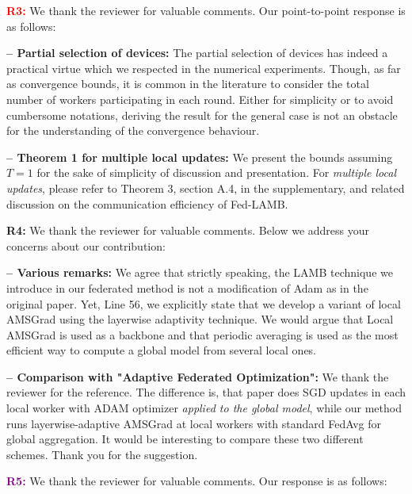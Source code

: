 \documentclass{article}
\begin{document}
 \vspace{1pt}
\textbf{\textcolor{red}{R3:}} We thank the reviewer for valuable comments.  Our point-to-point response is as follows: \vspace{-1pt}

\textbf{-- Partial selection of devices:} The partial selection of devices has indeed a practical virtue which we respected in the numerical experiments.
Though, as far as convergence bounds, it is common in the literature to consider the total number of workers participating in each round.
Either for simplicity or to avoid cumbersome notations, deriving the result for the general case is not an obstacle for the understanding of the convergence behaviour.

\vspace{-0.5pt}
\textbf{-- Theorem 1 for multiple local updates:} 
We present the bounds assuming $T =1$ for the sake of simplicity of discussion and presentation.
For \emph{multiple local updates}, please refer to Theorem 3, section A.4, in the supplementary, and related discussion on the communication efficiency of Fed-LAMB. 
 
 \vspace{1pt}
\textbf{\textcolor{green!50!black}{R4:}} We thank the reviewer for valuable comments. Below we address your concerns about our contribution: \vspace{-1pt}

\textbf{-- Various remarks:}
We agree that strictly speaking, the LAMB technique we introduce in our federated method is not a modification of Adam as in the original paper.
Yet, Line 56, we explicitly state that we develop a variant of local AMSGrad using the layerwise adaptivity technique.
We would argue that Local AMSGrad is used as a backbone and that periodic averaging is used as the most efficient way to compute a global model from several local ones.

\vspace{-0.5pt}
\textbf{-- Comparison with "Adaptive Federated Optimization":} 
We thank the reviewer for the reference.
The difference is, that paper does SGD updates in each local worker with ADAM optimizer \emph{applied to the global model}, while our method runs layerwise-adaptive AMSGrad at local workers with standard FedAvg for global aggregation.
It would be interesting to compare these two different schemes. 
Thank you for the suggestion.

 \vspace{1pt}
\textbf{\textcolor{purple}{R5:}} We thank the reviewer for valuable comments. Our response is as follows: \vspace{-1pt}
\end{document}
